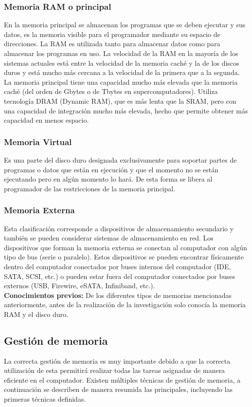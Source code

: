 \documentclass{article}
\begin{document}
\subsubsection{Memoria RAM o principal}
En la memoria principal se almacenan los programas que se deben ejecutar y sus datos, es la memoria visible para el programador mediante su espacio de direcciones.
La RAM es utilizada tanto para almacenar datos como para almacenar los programas en uso. La velocidad de la RAM en la mayoría de los sistemas actuales está entre la velocidad de la memoria caché y la de los discos duros y está mucho más cercana a la velocidad de la primera que a la segunda.\cite{MIT} \break
La memoria principal tiene una capacidad mucho más elevada que la memoria caché (del orden de Gbytes o de Tbytes en supercomputadores). Utiliza tecnología DRAM (Dynamic RAM), que es más lenta que la SRAM, pero con una capacidad de integración mucho más elevada, hecho que permite obtener más capacidad en menos espacio.\cite{Estructura}

\subsubsection{Memoria Virtual}
Es una parte del disco duro designada exclusivamente para soportar partes de programas o datos que están en ejecución y que el momento no se están ejecutando pero en algún momento lo hará. De esta forma se libera al programador de las restricciones de la memoria principal.

\subsubsection{Memoria Externa}
Esta clasificación corresponde a dispositivos de almacenamiento secundario y también se pueden considerar sistemas de almacenamiento en red. Los dispositivos que forman la memoria externa se conectan al computador con algún tipo de bus (serie o paralelo). Estos dispositivos se pueden encontrar físicamente dentro del computador conectados por buses internos del computador (IDE, SATA, SCSI, etc.) o pueden estar fuera del computador conectados por buses externos (USB, Firewire, eSATA, Infiniband, etc.).\cite{Estructura}\\

\textbf{Conocimientos previos: }De los diferentes tipos de memorias mencionadas anteriormente, antes de la realización de la investigación solo conocía la memoria RAM y el disco duro.

\subsection{Gestión de memoria}
La correcta gestión de memoria es muy importante debido a que la correcta utilización de esta permitirá realizar todas las tareas asignadas de manera eficiente en el computador. Existen múltiples técnicas de gestión de memoria, a continuación se describen de manera resumida las principales, incluyendo las primeras técnicas definidas.\cite{Gestion}
\end{document}
